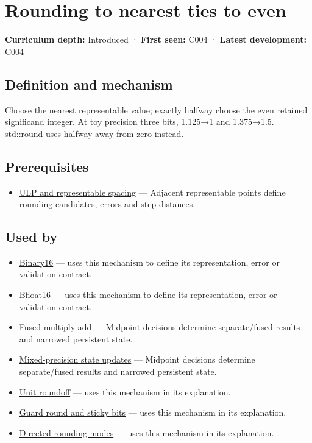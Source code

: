 \hypertarget{appendix-614afe1de592}{}
\section{Rounding to nearest ties to even}\label{appendix-614afe1de592-rounding-to-nearest-ties-to-even}

\textbf{Curriculum depth:} Introduced · \textbf{First seen:} C004 · \textbf{Latest development:} C004

\subsection{Definition and mechanism}\label{appendix-614afe1de592-definition-and-mechanism}

Choose the nearest representable value; exactly halfway choose the even retained significand integer. At toy precision three bits, 1.125→1 and 1.375→1.5. std::round uses halfway-away-from-zero instead.

\subsection{Prerequisites}\label{appendix-614afe1de592-prerequisites}

\begin{itemize}
\tightlist
\item
  \hyperref[appendix-14bab4cab9d4]{ULP and representable spacing} --- Adjacent representable points define rounding candidates, errors and step distances.
\end{itemize}

\subsection{Used by}\label{appendix-614afe1de592-used-by}

\begin{itemize}
\item
  \hyperref[appendix-34443cec7170]{Binary16} --- uses this mechanism to define its representation, error or validation contract.
\item
  \hyperref[appendix-18b8dd966b5d]{Bfloat16} --- uses this mechanism to define its representation, error or validation contract.
\item
  \hyperref[appendix-41e8ef22a21e]{Fused multiply-add} --- Midpoint decisions determine separate/fused results and narrowed persistent state.
\item
  \hyperref[appendix-260182e617b7]{Mixed-precision state updates} --- Midpoint decisions determine separate/fused results and narrowed persistent state.
\item
  \hyperref[appendix-bc44f7b42f42]{Unit roundoff} --- uses this mechanism in its explanation.
\item
  \hyperref[appendix-b572b631069b]{Guard round and sticky bits} --- uses this mechanism in its explanation.
\item
  \hyperref[appendix-637d164ae5ca]{Directed rounding modes} --- uses this mechanism in its explanation.
\end{itemize}

